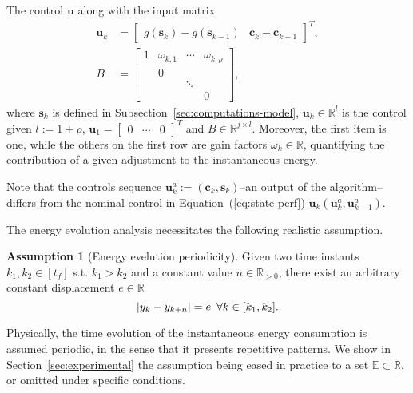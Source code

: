 \documentclass[letterpaper,10pt,conference]{ieeeconf}
\DeclarePairedDelimiter\abs{\lvert}{\rvert}%
\theoremstyle{definition}
\newtheorem{assm}[thm]{Assumption}
\begin{document}
The control $\mathbf{u}$ along with the input matrix
\begin{equation}\label{eq:state-control}\begin{split}  
  \mathbf{u}_k&=\begin{bmatrix}g(\mathbf{s}_k)-g(\mathbf{s}_{k-1}) & \mathbf{c}_k-\mathbf{c}_{k-1}\end{bmatrix}^T,\\
  B&=\left[\begin{array}{cccc}
    1& \omega_{k,1}& \cdots& \omega_{k,\rho}  \\
     &            0&       &  \\
     &             & \ddots&  \\
     &             &       & 0
  \end{array}\right],
\end{split}\end{equation}
where $\mathbf{s}_k$ is defined in Subsection~\ref{sec:computations-model}, $\mathbf{u}_k\in\mathbb{R}^l$ is the control given $l:=1+\rho$, $\mathbf{u}_{1}=\begin{bmatrix}0 & \cdots & 0\end{bmatrix}^T$ and $B\in\mathbb{R}^{j\times l}$. Moreover, the first item is one, while the others on the first row are gain factors $\omega_{k}\in\mathbb{R}$, quantifying the contribution of a given adjustment to the instantaneous energy. 

Note that the controls sequence $\mathbf{u}_k^a:=(\mathbf{c}_{k},\mathbf{s}_{k})$--an output of the algorithm--differs from the nominal control in Equation~(\ref{eq:state-perf}) $\mathbf{u}_k(\mathbf{u}_k^a,\mathbf{u}_{k-1}^a)$. 

The energy evolution analysis necessitates the following realistic assumption.
\begin{assm}[Energy evelution periodicity]\label{assm:periodic} 
Given two time instants $k_1,k_2\in[t_f]$ s.t. $k_1>k_2$ and a constant value $n\in\mathbb{R}_{> 0}$, there exist an arbitrary constant displacement $e\in\mathbb{R}$
\begin{equation}
  \abs{y_{k}-y_{k+n}}= e\,\,\,\forall k\in[k_1,k_2].
\end{equation}
\end{assm}

Physically, the time evolution of the instantaneous energy consumption is assumed periodic, in the sense that it presents repetitive patterns. We show in Section~\ref{sec:experimental} the assumption being eased in practice to a set $\mathbb{E}\subset\mathbb{R}$, or omitted under specific conditions.
\end{document}
